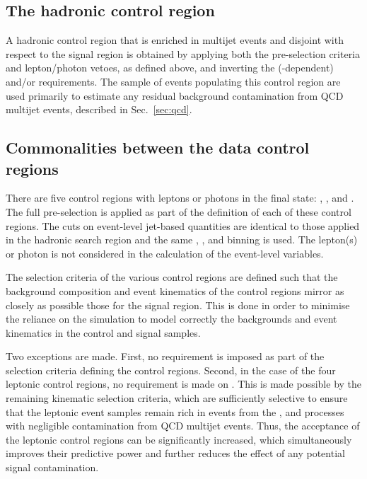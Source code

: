 \subsection{The hadronic control region}

A hadronic control region that is enriched in multijet events and
disjoint with respect to the signal region is obtained by applying
both the pre-selection criteria and lepton/photon vetoes, as defined
above, and inverting the (\HT-dependent) \alphat and/or \mhtmet
requirements. 
The sample of events populating this control region are used primarily
to estimate any residual background contamination from QCD multijet
events, described in Sec.~\ref{sec:qcd}.

\subsection{Commonalities between the data control regions}

There are five control regions with leptons or photons in the final
state: \mj, \mmj, and \gj. 
The full pre-selection is applied as part of the definition of each of these control
regions. The cuts on event-level jet-based quantities are identical to
those applied in the hadronic search region and the same \njet, \nb,
and \scalht binning is used. The lepton(s) or photon is not considered
in the calculation of the event-level variables.

The selection criteria of the various control regions are defined such
that the background composition and event kinematics of the control
regions mirror as closely as possible those for the signal
region. This is done in order to minimise the reliance on the
simulation to model correctly the backgrounds and event kinematics in
the control and signal samples.

Two exceptions are made. First, no \bdphi requirement is imposed as
part of the selection criteria defining the control regions. Second,
in the case of the four leptonic control regions, no requirement is
made on \alphat. This is made possible by the remaining kinematic
selection criteria, which are sufficiently selective to ensure that
the leptonic event samples remain rich in events from the \wj, \ttbar
and \zll processes with negligible contamination from QCD multijet
events. Thus, the acceptance of the leptonic control regions can be
significantly increased, which simultaneously improves their
predictive power and further reduces the effect of any potential
signal contamination.

